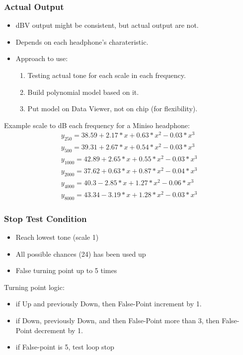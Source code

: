 \documentclass[table,dvipsnames]{beamer}
\begin{document}
	\begin{frame}
		\frametitle{Actual Output}
		
		\begin{exampleblock}{}
			\begin{itemize}
				\item dBV output might be consistent, but actual output are not.
				\item Depends on each headphone's charateristic.
				\item Approach to use:
				\begin{enumerate}
					\item Testing actual tone for each scale in each frequency.
					\item Build polynomial model based on it.
					\item Put model on Data Viewer, not on chip (for flexibility).
				\end{enumerate}
			\end{itemize}
		\end{exampleblock}
	
		\begin{exampleblock}{}
			Example scale to dB each frequency for a Miniso headphone:
			\begin{gather}
y_{250} = 38.59 + 2.17*x + 0.63*x^2 - 0.03*x^3 \\
y_{500} = 39.31 + 2.67*x + 0.54*x^2 - 0.03*x^3
\\
y_{1000} = 42.89 + 2.65*x + 0.55*x^2 - 0.03*x^3
\\
y_{2000} = 37.62 + 0.63*x + 0.87*x^2 - 0.04*x^3
\\
y_{4000} = 40.3  - 2.85*x + 1.27*x^2 - 0.06*x^3
\\
y_{8000} = 43.34 - 3.19*x + 1.28*x^2 - 0.03*x^3
			\end{gather}
		\end{exampleblock}
	\end{frame}

	\begin{frame}
		\frametitle{Stop Test Condition}
		
		\begin{exampleblock}{}
			\begin{itemize}
				\item Reach lowest tone (scale 1)
				\item All possible chances (24) has been used up
				\item False turning point up to 5 times
			\end{itemize}
		\end{exampleblock}
	
		\begin{exampleblock}{}
			Turning point logic:
			\begin{itemize}
				\item if Up and previously Down, then False-Point increment by 1.
				\item if Down, previously Down, and then False-Point more than 3, then False-Point decrement by 1.
				\item if False-point is 5, test loop stop
			\end{itemize}
		\end{exampleblock}
	\end{frame}
\end{document}
